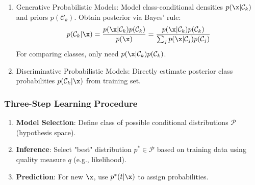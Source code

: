 \begin{enumerate}
    \item \alert{Generative Probabilistic Models}: Model class-conditional densities $p(\x|{\mathcal{C}}_{k})$ and priors $p({\mathcal{C}}_{k})$. Obtain posterior via Bayes' rule:
    \begin{equation*}
    p({\mathcal{C}}_{k}|\x) = \frac{p(\x|{\mathcal{C}}_{k})p({\mathcal{C}}_{k})}{p(\x)} = \frac{p(\x|{\mathcal{C}}_{k})p({\mathcal{C}}_{k})}{\sum_j p(\x|{\mathcal{C}}_{j})p({\mathcal{C}}_{j})}
    \end{equation*}
    For comparing classes, only need $p(\x|{\mathcal{C}}_{k})p({\mathcal{C}}_{k})$.
    
    \item \alert{Discriminative Probabilistic Models}: Directly estimate posterior class probabilities $p({\mathcal{C}}_{k}|\x)$ from training set.
\end{enumerate}

\subsubsection*{Three-Step Learning Procedure}
\begin{enumerate}
    \item \textbf{Model Selection}: Define class of possible conditional distributions $\mathcal{P}$ (hypothesis space).
    \item \textbf{Inference}: Select "best" distribution $p^* \in \mathcal{P}$ based on training data using quality measure $q$ (e.g., likelihood).
    \item \textbf{Prediction}: For new $\x$, use $p^*(t|\x)$ to assign probabilities.
\end{enumerate}

